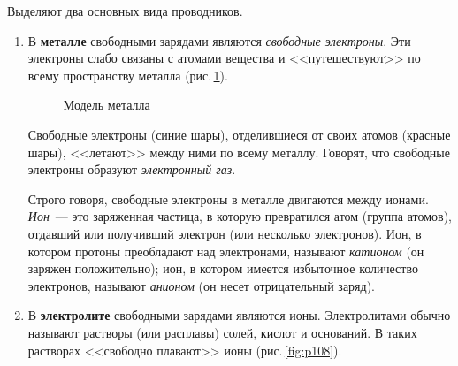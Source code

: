 \documentclass[main.tex]{subfiles}
\begin{document}
Выделяют два основных вида проводников.
\begin{enumerate}
    \item В \textbf{металле} свободными зарядами являются \emph{свободные электроны}. Эти электроны слабо связаны с атомами вещества и <<путешествуют>> по всему пространству металла (рис.\,\ref{fig:p107}).

    \begin{figure}[H]
    \centering

\caption{Модель металла}
\label{fig:p107}
\end{figure}
\nointerlineskip

    Свободные электроны (синие шары), отделившиеся от своих атомов (красные шары), <<летают>> между ними по всему металлу. Говорят, что свободные электроны образуют \emph{электронный газ}.

    Строго говоря, свободные электроны в металле двигаются между ионами. \emph{Ион}~--- это заряженная частица, в которую превратился атом (группа атомов), отдавший или получивший электрон (или несколько электронов). 
    Ион, в котором протоны преобладают над электронами, называют \emph{катионом} (он заряжен положительно); ион, в котором имеется избыточное количество электронов, называют \emph{анионом} (он несет отрицательный заряд). 
    
    \item В \textbf{электролите} свободными зарядами являются ионы. Электролитами обычно называют растворы (или расплавы) солей, кислот и оснований. В таких растворах <<свободно плавают>> ионы (рис.\,\ref{fig:p108}).


\end{enumerate}
\end{document}
